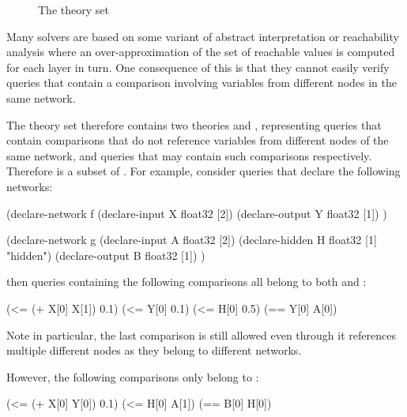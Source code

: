\begin{figure}[h]
\centering
{}
\caption{The \multiComparison{} theory set}
\label{fig:multi-node-comparisons-theory-set}
\end{figure}

Many solvers are based on some variant of abstract interpretation or reachability analysis where an over-approximation of the set of reachable values is computed for each layer in turn.
One consequence of this is that they cannot easily verify queries that contain a comparison involving variables from different nodes in the same network.

The \multiComparison{} theory set therefore contains two theories \snc{} and \mnc{}, representing queries that contain comparisons that do not reference variables from different nodes of the same network, and queries that may contain such comparisons respectively. Therefore \snc{} is a subset of \mnc{}. For example, consider queries that declare the following networks:

\begin{code}[style=lbnf]
(declare-network f
    (declare-input  X float32 [2])
    (declare-output Y float32 [1])
)

(declare-network g
    (declare-input  A float32 [2])
    (declare-hidden H float32 [1] "hidden")
    (declare-output B float32 [1])
)
\end{code}

\noindent then queries containing the following comparisons all belong to both \snc{} and \mnc{}:

\begin{code}[style=lbnf]
(<= (+ X[0] X[1]) 0.1)
(<= Y[0] 0.1)
(<= H[0] 0.5)
(== Y[0] A[0])
\end{code}

\noindent Note in particular, the last comparison is still allowed even through it references multiple different nodes as they belong to different networks. 

However, the following comparisons only belong to \mnc{}:

\begin{code}[style=lbnf]
(<= (+ X[0] Y[0]) 0.1)
(<= H[0] A[1])
(== B[0] H[0])
\end{code}

